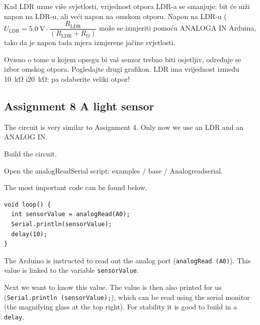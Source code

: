 \documentclass{arduino}
\begin{document}

Kad LDR uzme više svjetlosti, vrijednost otpora LDR-a se smanjuje: bit će niži napon na LDR-u, ali veći napon na omskom otporu. Napon na LDR-u ($ U_\mathrm{LDR} = \SI{5.0}{\volt} \cdot \dfrac{R_\mathrm{LDR}}{(R_\mathrm{LDR} + R_{\si{\ohm}})} $ može se izmjeriti pomoću ANALOGA IN Arduina, tako da je napon tada mjera izmjerene jačine svjetlosti.

Ovisno o tome u kojem opsegu bi vaš senzor trebao biti osjetljiv, određuje se izbor omskog otpora. Pogledajte drugi grafikon. LDR ima vrijednost između \SI{10}{\kilo\ohm} i\SI{20}{\kilo\ohm}: pa odaberite veliki otpor!

\newpage

\subsection{Assignment 8 A light sensor}


The circuit is very similar to Assignment 4. Only now we use an LDR and an ANALOG IN.

\begin{alphalist}
\item Build the circuit.

\item Open the analogReadSerial  script: examples / base / Analogreadserial.
\end{alphalist}

The most important code can be found below.

\begin{lstlisting}
void loop() {
  int sensorValue = analogRead(A0);
  Serial.println(sensorValue);
  delay(10);
}
\end{lstlisting}

The Arduino is instructed to read out the analog port (\lstinline{analogRead (A0)}). This value is linked to the variable \lstinline{sensorValue}. 

Next we want to know this value. The value is then also printed for us (\lstinline{Serial.println (sensorValue);}), which can be read using the serial monitor (the magnifying glass at the top right). For stability it is good to build in a \lstinline{delay}.
\end{document}
